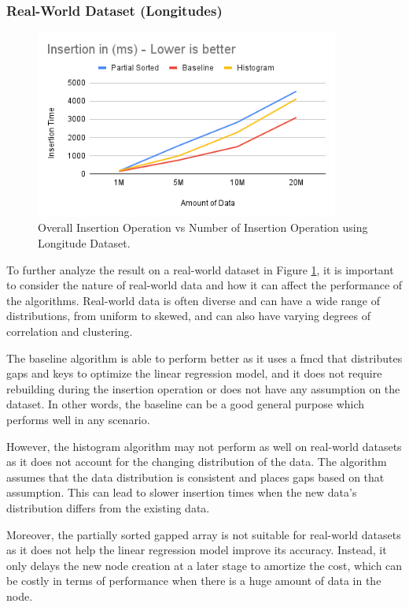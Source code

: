 \subsubsection{Real-World Dataset (Longitudes)}
\begin{figure}[H]
    \centering
    \includegraphics[width=100mm,scale=1]{Figures/InsertionResultLongitude.png}
    \caption{
       Overall Insertion Operation vs Number of Insertion Operation using Longitude Dataset.
    }
    \label{fig:GraphInsertionResultLongitude}
\end{figure}
To further analyze the result on a real-world dataset in Figure \ref{fig:GraphInsertionResultLongitude}, it is important to consider the nature of real-world data and how it can affect the performance of the algorithms. Real-world data is often diverse and can have a wide range of distributions, from uniform to skewed, and can also have varying degrees of correlation and clustering.

The baseline algorithm is able to perform better as it uses a \acrshort{fmcd} that distributes gaps and keys to optimize the linear regression model, and it does not require rebuilding during the insertion operation or does not have any assumption on the dataset. In other words, the baseline can be a good general purpose which performs well in any scenario. 

However, the histogram algorithm may not perform as well on real-world datasets as it does not account for the changing distribution of the data. The algorithm assumes that the data distribution is consistent and places gaps based on that assumption. This can lead to slower insertion times when the new data's distribution differs from the existing data.

Moreover, the partially sorted gapped array is not suitable for real-world datasets as it does not help the linear regression model improve its accuracy. Instead, it only delays the new node creation at a later stage to amortize the cost, which can be costly in terms of performance when there is a huge amount of data in the node.


